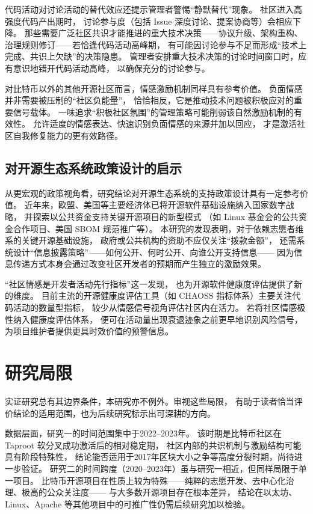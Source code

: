 \documentclass[
    type = master, %
    degree = professional,        %
    decl-page,  %
    twoside,                %
    fontset = fandol %
  ]{njuthesis}
\begin{document}
代码活动对讨论活动的替代效应还提示管理者警惕“静默替代”现象。
社区进入高强度代码产出期时，
讨论参与度（包括 Issue 深度讨论、提案协商等）会相应下降。
那些需要广泛社区共识才能推进的重大技术决策——协议升级、架构重构、
治理规则修订——若恰逢代码活动高峰期，
有可能因讨论参与不足而形成“技术上完成、共识上欠缺”的决策隐患。
管理者安排重大技术决策的讨论时间窗口时，应有意识地错开代码活动高峰，
以确保充分的讨论参与。

对比特币以外的其他开源社区而言，情感激励机制同样具有参考价值。
负面情感并非需要被压制的“社区负能量”，
恰恰相反，它是推动技术问题被积极应对的重要信号载体。
一味追求“积极社区氛围”的管理策略可能削弱该自然激励机制的有效性。
允许适度的情感表达、快速识别负面情感的来源并加以回应，
才是激活社区自我修复能力的更有效路径。

\subsection{对开源生态系统政策设计的启示}

从更宏观的政策视角看，研究结论对开源生态系统的支持政策设计具有一定参考价值。
近年来，欧盟、美国等主要经济体已将开源软件基础设施纳入国家数字战略，
并探索以公共资金支持关键开源项目的新型模式
（如 Linux 基金会的公共资金合作项目、美国 SBOM 规范推广等）。
本研究的发现表明，对于依赖志愿者维系的关键开源基础设施，
政府或公共机构的资助不应仅关注“拨款金额”，
还需系统设计“信息披露策略”——如何公开、何时公开、向谁公开支持信息——
因为信息传递方式本身会通过改变社区开发者的预期而产生独立的激励效果。

“社区情感是开发者活动先行指标”这一发现，
也为开源软件健康度评估提供了新的维度。
目前主流的开源健康度评估工具（如 CHAOSS 指标体系）主要关注代码活动的数量型指标，
较少从情感信号视角评估社区内在活力。
若将社区情感极性纳入健康度评估体系，
便可在活动量出现衰退迹象之前更早地识别风险信号，
为项目维护者提供更具时效价值的预警信息。


\section{研究局限}

实证研究总有其边界条件，本研究亦不例外。审视这些局限，
有助于读者恰当评价结论的适用范围，也为后续研究标示出可深耕的方向。

数据层面，研究一的时间范围集中于2022--2023年。
该时期是比特币社区在 Taproot 软分叉成功激活后的相对稳定期，
社区内部的共识机制与激励结构可能具有阶段特殊性，
结论能否适用于2017年区块大小之争等高度分裂时期，尚待进一步验证。
研究二的时间跨度（2020--2023年）虽与研究一相近，但同样局限于单一项目。
比特币开源项目在性质上较为特殊——纯粹的志愿开发、去中心化治理、极高的公众关注度——
与大多数开源项目存在根本差异，
结论在以太坊、Linux、Apache 等其他项目中的可推广性仍需后续研究加以检验。
\end{document}
